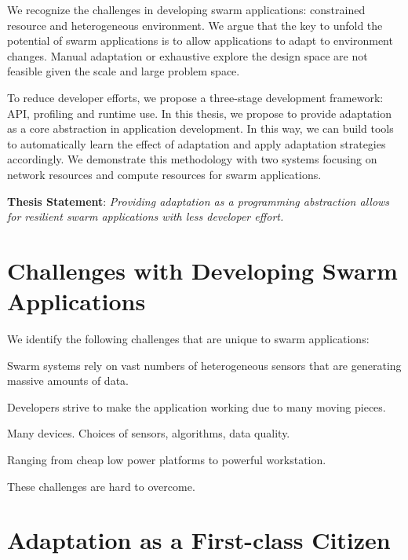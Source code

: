 \documentclass[thesis.tex]{subfiles}
\begin{document}
We recognize the challenges in developing swarm applications: constrained
resource and heterogeneous environment. We argue that the key to unfold the
potential of swarm applications is to allow applications to adapt to environment
changes. Manual adaptation or exhaustive explore the design space are not
feasible given the scale and large problem space.

To reduce developer efforts, we propose a three-stage development framework:
API, profiling and runtime use. In this thesis, we propose to provide adaptation
as a core abstraction in application development. In this way, we can build
tools to automatically learn the effect of adaptation and apply adaptation
strategies accordingly. We demonstrate this methodology with two systems
focusing on network resources and compute resources for swarm applications.

\vspace{1em}

\noindent\textbf{Thesis Statement}: \textit{Providing adaptation as a programming
  abstraction allows for resilient swarm applications with less developer
  effort.}

\vspace{1em}

\section{Challenges with Developing Swarm Applications}
\label{sec:chall-with-exist}

We identify the following challenges that are unique to swarm applications:

 Swarm systems rely on vast numbers of heterogeneous
sensors that are generating massive amounts of data.

 Developers strive to make the application working due
to many moving pieces.

 Many devices. Choices of sensors, algorithms, data
quality.

 Ranging from cheap low power platforms to
powerful workstation.

These challenges are hard to overcome.

\section{Adaptation as a First-class Citizen}
\label{sec:adaptation}
\end{document}
